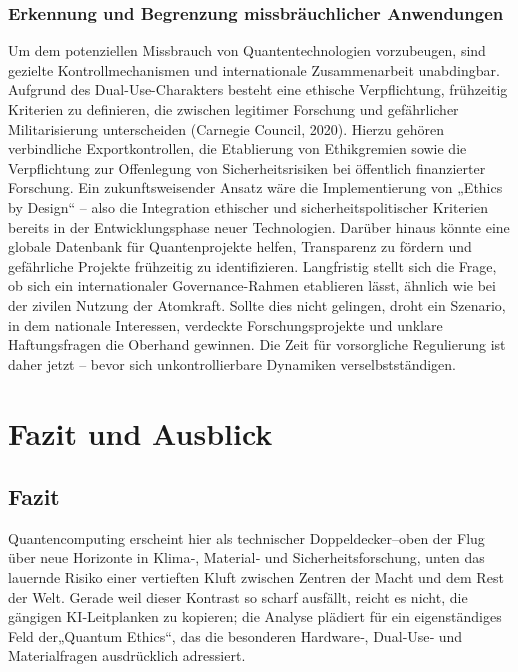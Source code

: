  \subsubsection{Erkennung und Begrenzung missbräuchlicher Anwendungen}
 Um dem potenziellen Missbrauch von Quantentechnologien vorzubeugen, sind gezielte Kontrollmechanismen und internationale Zusammenarbeit unabdingbar. Aufgrund des Dual-Use-Charakters besteht eine ethische Verpflichtung, frühzeitig Kriterien zu definieren, die zwischen legitimer Forschung und gefährlicher Militarisierung unterscheiden (Carnegie Council, 2020)\cite{malekos_smith_preparing_2023}. Hierzu gehören verbindliche Exportkontrollen, die Etablierung von Ethikgremien sowie die Verpflichtung zur Offenlegung von Sicherheitsrisiken bei öffentlich finanzierter Forschung.
Ein zukunftsweisender Ansatz wäre die Implementierung von „Ethics by Design“ – also die Integration ethischer und sicherheitspolitischer Kriterien bereits in der Entwicklungsphase neuer Technologien. Darüber hinaus könnte eine globale Datenbank für Quantenprojekte helfen, Transparenz zu fördern und gefährliche Projekte frühzeitig zu identifizieren.
Langfristig stellt sich die Frage, ob sich ein internationaler Governance-Rahmen etablieren lässt, ähnlich wie bei der zivilen Nutzung der Atomkraft. Sollte dies nicht gelingen, droht ein Szenario, in dem nationale Interessen, verdeckte Forschungsprojekte und unklare Haftungsfragen die Oberhand gewinnen. Die Zeit für vorsorgliche Regulierung ist daher jetzt – bevor sich unkontrollierbare Dynamiken verselbstständigen.

 


 

 
 

 

\section{Fazit und Ausblick}
\subsection{Fazit}


Quantencomputing erscheint hier als technischer Doppeldecker–oben der Flug über neue Horizonte in Klima‑, Material‑ und Sicherheitsforschung, unten das lauernde Risiko einer vertieften Kluft zwischen Zentren der Macht und dem Rest der Welt. Gerade weil dieser Kontrast so scharf ausfällt, reicht es nicht, die gängigen KI‑Leitplanken zu kopieren; die Analyse plädiert für ein eigenständiges Feld der„Quantum Ethics“, das die besonderen Hardware‑, Dual‑Use‑ und Materialfragen ausdrücklich adressiert.

